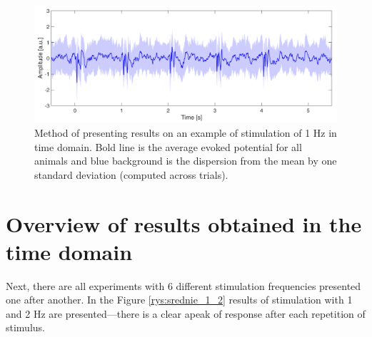\documentclass{pracalicmgr}
\begin{document}
	\begin{figure}[H]
		\centering
		\includegraphics[width=1.\linewidth]{przyklad_odch2.png}
		\caption{Method of presenting results on an example of stimulation of 1 Hz in time domain. Bold line is the average evoked potential for all animals and blue background is the dispersion from the mean by one standard deviation (computed across trials). }
		\label{rys:przyklad_odch}
	\end{figure}

    \section{Overview of results obtained in the time domain}
    \label{sec:time}
    Next, there are all experiments with 6 different stimulation frequencies presented one after another. In the Figure \ref{rys:srednie_1_2} results of stimulation with 1 and 2 Hz are presented---there is a clear apeak of response after each repetition of stimulus.
    
\end{document}
